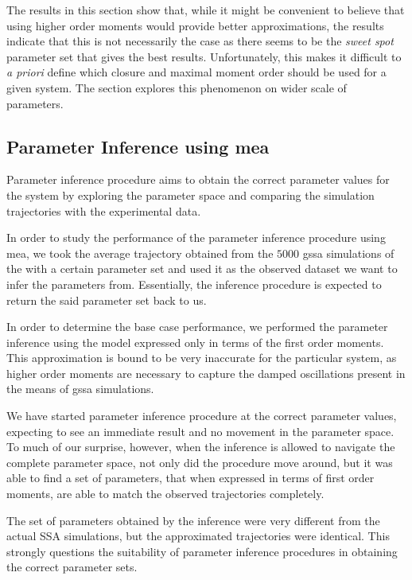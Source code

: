The results in this section show that, while it might be convenient to believe that using higher order moments would provide better approximations, the results indicate that this is not necessarily the case as there seems to be the \emph{sweet spot} parameter set that gives the best results. Unfortunately, this makes it difficult to \emph{a priori} define which closure and maximal moment order should be used for a given system. The section  explores this phenomenon on wider scale of parameters.

\subsection{Parameter Inference using \acrlong{mea}}
Parameter inference procedure aims to obtain the correct parameter values for the system by exploring the parameter space and comparing the simulation trajectories with the experimental data. 

In order to study the performance of the parameter inference procedure using \acrlong{mea}, we took the average trajectory obtained from the  $5000$ \gls{gssa} simulations of the \pft{} with a certain parameter set and used it as the observed dataset we want to infer the parameters from. Essentially, the inference procedure is expected to return the said parameter set back to us.

In order to determine the base case performance, we performed the parameter inference using the \pft{} model expressed only in terms of the first order moments. This approximation is bound to be very inaccurate for the particular system, as higher order moments are necessary to capture the damped oscillations present in the means of \gls{gssa} simulations\cite{ale_general_2013}.

We have started parameter inference procedure at the correct parameter values, expecting to see an immediate result and no movement in the parameter space. To much of our surprise, however, when the inference is allowed to navigate the complete parameter space, not only did the procedure move around, but it was able to find a set of parameters, that when expressed in terms of first order moments, are able to match the observed trajectories completely.

The set of parameters obtained by the inference were very different from the actual SSA simulations, but the approximated trajectories were identical. This strongly questions the suitability of parameter inference procedures in obtaining the correct parameter sets.


